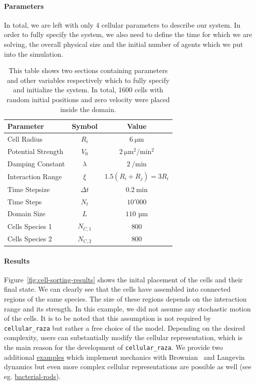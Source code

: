 \documentclass[fontsize=11pt,a4paper]{article}
\begin{document}
\paragraph{Parameters}
In total, we are left with only 4 cellular parameters to describe our system.
In order to fully specify the system, we also need to define the time for which we are solving, the
overall physical size and the initial number of agents which we put into the simulation.

\begin{table}
    \centering
    \begin{tabular}{l c c}
        Parameter & Symbol & Value\\
        \hline
        Cell Radius & $R_i$ & $\SI{6}{\micro\metre}$\\
        Potential Strength & $V_0$ & $\SI{2}{\micro\metre^2\per\minute^2}$\\
        Damping Constant & $\lambda$ & $\SI{2}{\per\minute}$\\
        Interaction Range & $\xi$ & $1.5 (R_i+R_j)=3R_i$\\
        \hline
        Time Stepsize & $\Delta t$ & $\SI{0.2}{\minute}$\\
        Time Steps & $N_t$ & $10'000$\\
        Domain Size & $L$ & $110\text{ µm}$\\
        Cells Species 1 & $N_{C,1}$ & $800$\\
        Cells Species 2 & $N_{C,2}$ & $800$\\
    \end{tabular}
    \caption{
        This table shows two sections containing parameters and other variables respectively which
        to fully specify and initialize the system.
        In total, 1600 cells with random initial positions and zero velocity were placed inside the
        domain.
    }
    \label{tab:cell-sorting-parameters}
\end{table}

\paragraph{Results}
Figure~\ref{fig:cell-sorting-results} shows the inital placement of the cells and their final state.
We can clearly see that the cells have assembled into connected regions of the same species.
The size of these regions depends on the interaction range and its strength.
In this example, we did not assume any stochastic motion of the cells.
It is to be noted that this assumption is not required by \texttt{cellular\_raza} but rather a
free choice of the model.
Depending on the desired complexity, users can substantially modify the cellular representation,
which is the main reason for the development of \texttt{cellular\_raza}.
We provide two additional
\href{https://github.com/jonaspleyer/cellular_raza/cellular_raza-examples/cell_sorting}{examples}
which implement mechanics with Brownian~\cite{Schlick2002} and
Langevin~\cite{Schlick2002,Pastor1994} dynamics but even more complex cellular representations are
possible as well (see eg. \href{https://cellular-raza.com/showcase/bacterial-rods}{bacterial-rods}).
\end{document}
